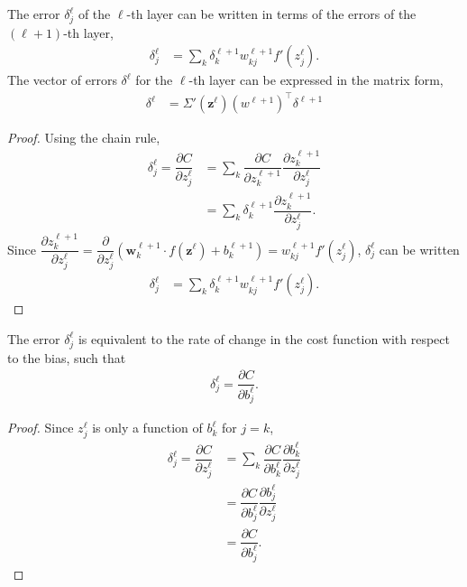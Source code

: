 \begin{lemma}
	The error $\delta^\ell_j$ of the $\ell$-th layer can be written in terms of the errors of the $(\ell + 1)$-th layer, 
	\begin{align}
		\delta_j^\ell & = \sum_k\delta_k^{\ell+1}w_{kj}^{\ell+1}f'(z_j^\ell).
	\end{align}
	The vector of errors $\delta^\ell$ for the $\ell$-th layer can be expressed in the matrix form,
	\begin{align}\label{nnets-bprop-eq2}
		\delta^\ell & = \Sigma'(\mathbf{z}^\ell)(w^{\ell+1})^\intercal\delta^{\ell+1}
	\end{align}
\end{lemma}

\begin{proof}
	Using the chain rule,
	\begin{align}
		\delta_j^\ell = \dfrac{\partial C}{\partial z_j^\ell}& = \sum_k\dfrac{\partial C}{\partial z_k^{\ell+1}}\dfrac{\partial z_k^{\ell+1}}{\partial z_j^\ell} \\
		& = \sum_k\delta_k^{\ell+1}\dfrac{\partial z_k^{\ell+1}}{\partial z_j^\ell}.
	\end{align}
	Since $\dfrac{\partial z_k^{\ell+1}}{\partial z_j^\ell} = \dfrac{\partial}{\partial z_j^\ell}(\mathbf{w}_k^{\ell+1}\cdot f(\mathbf{z}^\ell) + b_k^{\ell+1}) = w_{kj}^{\ell+1}f'(z_j^\ell)$, $\delta_j^\ell$ can be written
	\begin{align}
		\delta_j^\ell & = \sum_k\delta_k^{\ell+1}w_{kj}^{\ell+1}f'(z_j^\ell).
	\end{align}
\end{proof}

\begin{lemma}
	The error $\delta_j^\ell$ is equivalent to the rate of change in the cost function with respect to the bias, such that
	\begin{align}\label{nnets-bprop-eq3}
		\delta_j^\ell = \dfrac{\partial C}{\partial b_j^\ell}.
	\end{align}
\end{lemma}
\begin{proof}
	Since $z_j^\ell$ is only a function of $b_k^\ell$ for $j = k$,
	\begin{align}
		\delta_j^\ell = \dfrac{\partial C}{\partial z_j^\ell} & = \sum_k\dfrac{\partial C}{\partial b_k^\ell}\dfrac{\partial b_k^\ell}{\partial z_j^\ell}\\
		& = \dfrac{\partial C}{\partial b_j^\ell}\dfrac{\partial b_j^\ell}{\partial z_j^\ell} \\
		& = \dfrac{\partial C}{\partial b_j^\ell}.
	\end{align}
\end{proof}


